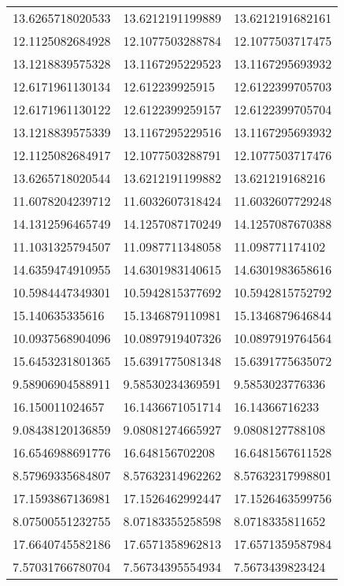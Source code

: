 \documentclass[10pt,a4paper]{article}
\begin{document}
\begin{center}
\begin{longtable}{ |p{2.8cm}|p{2.8cm}|p{2.8cm}| }
    13.6265718020533  & 13.6212191199889  & 13.6212191682161    \\
    12.1125082684928  & 12.1077503288784  & 12.1077503717475    \\
    13.1218839575328  & 13.1167295229523  & 13.1167295693932    \\
    12.6171961130134  & 12.612239925915   & 12.6122399705703    \\
    12.6171961130122  & 12.6122399259157  & 12.6122399705704    \\
    13.1218839575339  & 13.1167295229516  & 13.1167295693932    \\
    12.1125082684917  & 12.1077503288791  & 12.1077503717476    \\
    13.6265718020544  & 13.6212191199882  & 13.621219168216     \\
    11.6078204239712  & 11.6032607318424  & 11.6032607729248    \\
    14.1312596465749  & 14.1257087170249  & 14.1257087670388    \\
    11.1031325794507  & 11.0987711348058  & 11.098771174102     \\
    14.6359474910955  & 14.6301983140615  & 14.6301983658616    \\
    10.5984447349301  & 10.5942815377692  & 10.5942815752792    \\
    15.140635335616   & 15.1346879110981  & 15.1346879646844    \\
    10.0937568904096  & 10.0897919407326  & 10.0897919764564    \\
    15.6453231801365  & 15.6391775081348  & 15.6391775635072    \\
    9.58906904588911  & 9.58530234369591  & 9.5853023776336     \\
    16.150011024657   & 16.1436671051714  & 16.14366716233      \\
    9.08438120136859  & 9.08081274665927  & 9.0808127788108     \\
    16.6546988691776  & 16.648156702208   & 16.6481567611528    \\
    8.57969335684807  & 8.57632314962262  & 8.57632317998801    \\
    17.1593867136981  & 17.1526462992447  & 17.1526463599756    \\
    8.07500551232755  & 8.07183355258598  & 8.0718335811652     \\
    17.6640745582186  & 17.6571358962813  & 17.6571359587984    \\
    7.57031766780704  & 7.56734395554934  & 7.5673439823424     \\

\end{longtable}
\end{center}
\end{document}
